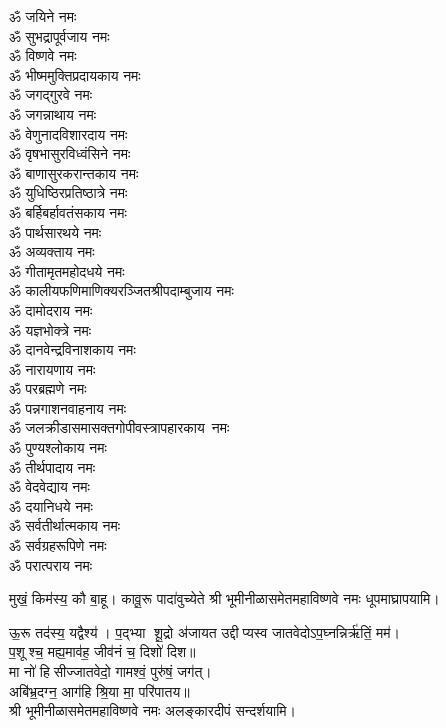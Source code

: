 \begin{multicols}{2}
\begin{flushleft}
ॐ जयिने नमः\hfill{}\\
ॐ सुभद्रापूर्वजाय नमः\\
ॐ विष्णवे नमः\\
ॐ भीष्ममुक्तिप्रदायकाय नमः\\
ॐ जगद्गुरवे नमः\\
ॐ जगन्नाथाय नमः\\
ॐ वेणुनादविशारदाय नमः\\
ॐ वृषभासुरविध्वंसिने नमः\\
ॐ बाणासुरकरान्तकाय नमः\\
ॐ युधिष्ठिरप्रतिष्ठात्रे नमः\\
ॐ बर्हिबर्हावतंसकाय नमः\hfill{}\\
ॐ पार्थसारथये नमः\\
ॐ अव्यक्ताय नमः\\
ॐ गीतामृतमहोदधये नमः\\
ॐ कालीयफणिमाणिक्य\-रञ्जित\-श्री\-पदाम्बुजाय नमः\\
ॐ दामोदराय नमः\\
ॐ यज्ञभोक्त्रे नमः\\
ॐ दानवेन्द्रविनाशकाय नमः\\
ॐ नारायणाय नमः\\
ॐ परब्रह्मणे नमः\\
ॐ पन्नगाशनवाहनाय नमः\hfill{}\\
ॐ जलक्रीडासमासक्त\-गोपी\-वस्त्रापहारकाय~नमः\\
ॐ पुण्यश्लोकाय नमः\\
ॐ तीर्थपादाय नमः\\
ॐ वेदवेद्याय नमः\\
ॐ दयानिधये नमः\\
ॐ सर्वतीर्थात्मकाय नमः\\
ॐ सर्वग्रहरूपिणे नमः\\
ॐ परात्पराय नमः\hfill{}\\
\end{flushleft}
\end{multicols}

  
{मुखं॒ किम॑स्य॒ कौ बा॒हू। कावू॒रू पादा॑वुच्येते}
श्री भूमीनीळासमेतमहाविष्णवे नमः धूपमाघ्रापयामि।\medskip
 
{ऊ॒रू तद॑स्य॒ यद्वैश्य॑। प॒द्भ्या शू॒द्रो अ॑जायत}
उद्दीप्यस्व जातवेदोऽप॒घ्नन्निर्ऋ॑तिं॒ मम॑।\\
 प॒शूश्च॒ मह्य॒माव॑ह॒ जीव॑नं च॒ दिशो॑ दिश॥ \\
मा नो॑ हिसीज्जातवेदो॒ गामश्वं॒ पुरु॑षं॒ जग॑त्।\\
अबि॑भ्र॒दग्न॒ आग॑हि श्रि॒या मा॒ परि॑पातय॥ \\
श्री भूमीनीळासमेतमहाविष्णवे नमः अलङ्कारदीपं सन्दर्शयामि।\medskip

